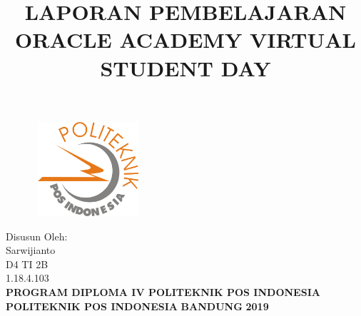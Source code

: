 \documentclass[a4paper, 12pt]{article}
\begin{document}
\title{\textbf{LAPORAN PEMBELAJARAN ORACLE ACADEMY VIRTUAL STUDENT DAY}}
\date{}

\maketitle

\begin{figure}[!ht]
\begin{center}
\includegraphics[width = 4cm, height = 3.5cm]{gambar/logo.png}
\end{center}
\end{figure}

\begin{center}
\vspace{1cm}
Disusun Oleh:\\
Sarwijianto\\
D4 TI 2B\\
1.18.4.103\\
\vspace{1cm}
\textbf{PROGRAM DIPLOMA IV POLITEKNIK POS INDONESIA} \linebreak
\textbf{POLITEKNIK POS INDONESIA} \linebreak
\textbf{BANDUNG}\linebreak
\textbf{2019}

\end{center}

\thispagestyle{empty}


\end{document}
